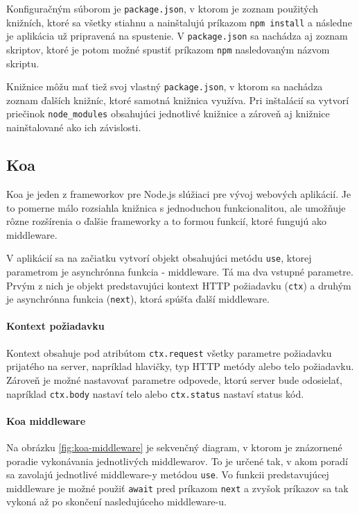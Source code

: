 \documentclass[
  digital, %
  table,   %
  lof,     %
  lot,     %
]{fithesis3}
\begin{document}
Konfiguračným súborom je \texttt{package.json}, v ktorom je zoznam použitých knižních, ktoré sa všetky stiahnu a nainštalujú príkazom \texttt{npm install} a následne je aplikácia už pripravená na spustenie. V \texttt{package.json} sa nachádza aj zoznam skriptov, ktoré je potom možné spustiť príkazom \texttt{npm} nasledovaným názvom skriptu.

Knižnice môžu mať tiež svoj vlastný \texttt{package.json}, v ktorom sa nachádza zoznam ďalších knižníc, ktoré samotná knižnica využíva. Pri inštalácií sa vytvorí priečinok \texttt{node\_modules} obsahujúci jednotlivé knižnice a zároveň aj knižnice nainštalované ako ich závislosti.

\subsection{Koa}
Koa je jeden z frameworkov pre Node.js slúžiaci pre vývoj webových aplikácií. Je to pomerne málo rozsiahla knižnica s jednoduchou funkcionalitou, ale umožňuje rôzne rozšírenia o ďalšie frameworky a to formou funkcií, ktoré fungujú ako middleware. 

V aplikácií sa na začiatku vytvorí objekt obsahujúci metódu \texttt{use}, ktorej parametrom je asynchrónna funkcia - middleware. Tá ma dva vstupné parametre. Prvým z nich je objekt predstavujúci kontext HTTP požiadavku (\texttt{ctx}) a druhým je asynchrónna funkcia (\texttt{next}), ktorá spúšťa ďalší middleware.

\paragraph{Kontext požiadavku}
Kontext obsahuje pod atribútom \texttt{ctx.request} všetky parametre požiadavku prijatého na server, napríklad hlavičky, typ HTTP metódy alebo telo požiadavku. Zároveň je možné nastavovať parametre odpovede, ktorú server bude odosielať, napríklad \texttt{ctx.body} nastaví telo alebo \texttt{ctx.status} nastaví status kód.

\paragraph{Koa middleware}
Na obrázku \ref{fig:koa-middleware} je sekvenčný diagram, v ktorom je znázornené poradie vykonávania jednotlivých middlewarov. To je určené tak, v akom poradí sa zavolajú jednotlivé middleware-y metódou \texttt{use}. Vo funkcii predstavujúcej middleware je možné použiť \texttt{await} pred príkazom 
\texttt{next} a zvyšok príkazov sa tak vykoná až po skončení nasledujúceho middleware-u.
\end{document}
